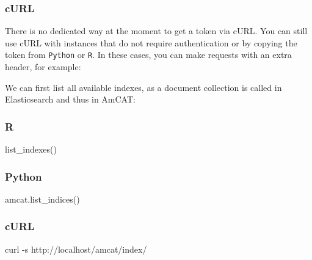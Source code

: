 \documentclass[
  letterpaper,
  DIV=11,
  numbers=noendperiod]{scrreprt}
\newenvironment{Shaded}{\begin{snugshade}}{\end{snugshade}}
\newcommand{\AttributeTok}[1]{\textcolor[rgb]{0.40,0.45,0.13}{#1}}
\newcommand{\DataTypeTok}[1]{\textcolor[rgb]{0.68,0.00,0.00}{#1}}
\newcommand{\ExtensionTok}[1]{\textcolor[rgb]{0.00,0.23,0.31}{#1}}
\newcommand{\FunctionTok}[1]{\textcolor[rgb]{0.28,0.35,0.67}{#1}}
\newcommand{\NormalTok}[1]{\textcolor[rgb]{0.00,0.23,0.31}{#1}}
\newcommand{\OperatorTok}[1]{\textcolor[rgb]{0.37,0.37,0.37}{#1}}
\newcommand{\StringTok}[1]{\textcolor[rgb]{0.13,0.47,0.30}{#1}}
\newcommand{\VariableTok}[1]{\textcolor[rgb]{0.07,0.07,0.07}{#1}}
\begin{document}
\subsubsection{cURL}

There is no dedicated way at the moment to get a token via cURL. You can
still use cURL with instances that do not require authentication or by
copying the token from \texttt{Python} or \texttt{R}. In these cases,
you can make requests with an extra header, for example:

\begin{Shaded}
\end{Shaded}

We can first list all available indexes, as a document collection is
called in Elasticsearch and thus in AmCAT:

\subsubsection{R}

\begin{Shaded}
\begin{Highlighting}[]
\FunctionTok{list\_indexes}\NormalTok{()}
\end{Highlighting}
\end{Shaded}

\subsubsection{Python}

\begin{Shaded}
\begin{Highlighting}[]
\NormalTok{amcat.list\_indices()}
\end{Highlighting}
\end{Shaded}

\subsubsection{cURL}

\begin{Shaded}
\begin{Highlighting}[]
\ExtensionTok{curl} \AttributeTok{{-}s}\NormalTok{ http://localhost/amcat/index/}
\end{Highlighting}
\end{Shaded}
\end{document}
